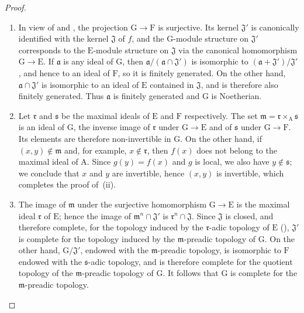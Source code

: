 \begin{proof}
\begin{enumerate}[label=(\roman*)]
  \item In view of  and , the projection $\mathrm{G}\to\mathrm{F}$ is surjective. Its kernel $\mathfrak{J}'$ is canonically identified with the kernel $\mathfrak{J}$ of $f$, and the $\mathrm{G}$-module structure on $\mathfrak{J}'$ corresponds to the $\mathrm{E}$-module structure on $\mathfrak{J}$ via the canonical homomorphism $\mathrm{G}\to\mathrm{E}$.
If $\mathfrak{a}$ is any ideal of $\mathrm{G}$, then $\mathfrak{a}/(\mathfrak{a}\cap\mathfrak{J}')$ is isomorphic to $(\mathfrak{a}+\mathfrak{J}')/\mathfrak{J}'$, and hence to an ideal of $\mathrm{F}$, so it is finitely generated. On the other hand, $\mathfrak{a}\cap\mathfrak{J}'$ is isomorphic to an ideal of $\mathrm{E}$ contained in $\mathfrak{J}$, and is therefore also finitely generated. Thus $\mathfrak{a}$ is finitely generated and $\mathrm{G}$ is Noetherian.
  \item Let $\mathfrak{r}$ and $\mathfrak{s}$ be the maximal ideals of $\mathrm{E}$ and $\mathrm{F}$ respectively. The set $\mathfrak{m}=\mathfrak{r}\times_{\mathrm{A}}\mathfrak{s}$ is an ideal of $\mathrm{G}$, the inverse image of $\mathfrak{r}$ under $\mathrm{G}\to\mathrm{E}$ and of $\mathfrak{s}$ under $\mathrm{G}\to\mathrm{F}$. Its elements are therefore non-invertible in $\mathrm{G}$.
On the other hand, if $(x,y)\notin\mathfrak{m}$ and, for example, $x\notin\mathfrak{r}$, then $f(x)$ does not belong to the maximal ideal of $\mathrm{A}$. Since $g(y)=f(x)$ and $g$ is local, we also have $y\notin\mathfrak{s}$; we
conclude that $x$ and $y$ are invertible, hence $(x,y)$ is invertible, which completes the proof of~(ii).
  \item The image of $\mathfrak{m}$ under the surjective homomorphism $\mathrm{G}\to\mathrm{E}$ is the maximal ideal $\mathfrak{r}$ of $\mathrm{E}$; hence the image of $\mathfrak{m}^n\cap\mathfrak{J}'$ is $\mathfrak{r}^n\cap\mathfrak{J}$. Since $\mathfrak{J}$ is closed, and therefore complete, for the topology induced by the $\mathfrak{r}$-adic topology of $\mathrm{E}$ (), $\mathfrak{J}'$ is complete for the topology induced by the $\mathfrak{m}$-preadic topology of $\mathrm{G}$.
On the other hand, $\mathrm{G}/\mathfrak{J}'$, endowed with the $\mathfrak{m}$-preadic topology, is isomorphic to $\mathrm{F}$ endowed with the $\mathfrak{s}$-adic topology, and is therefore complete for the quotient topology of the $\mathfrak{m}$-preadic topology of $\mathrm{G}$.
It follows that $\mathrm{G}$ is complete for the $\mathfrak{m}$-preadic topology.
\end{enumerate}


\end{proof}
